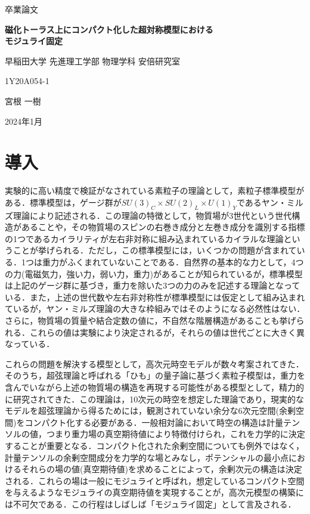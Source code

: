 \documentclass[a4paper,uplatex,dvipdfmx]{jsarticle}
\theoremstyle{definition}
\begin{document}
\begin{titlepage}
\begin{center}
\vspace*{10truemm}
\Large
卒業論文

\bigskip\bigskip
\textbf{\LARGE 
磁化トーラス上にコンパクト化した超対称模型における
\\
モジュライ固定
}

\vspace*{90truemm}
\large
早稲田大学 先進理工学部 物理学科 安倍研究室

\medskip
\large
1Y20A054-1

\bigskip
\Large
宮根 一樹

\bigskip\bigskip\bigskip\bigskip
\large
2024年1月
\end{center}
\end{titlepage}

\setcounter{tocdepth}{3}
\tableofcontents

\clearpage
\section{導入}

実験的に高い精度で検証がなされている素粒子の理論として，素粒子標準模型がある．標準模型は，ゲージ群が$SU(3)_{C}\times SU(2)_{L}\times U(1)_{Y}$であるヤン・ミルズ理論により記述される．この理論の特徴として，物質場が3世代という世代構造があることや，その物質場のスピンの右巻き成分と左巻き成分を識別する指標の1つであるカイラリティが左右非対称に組み込まれているカイラルな理論ということが挙げられる．ただし，この標準模型には，いくつかの問題が含まれている．1つは重力がふくまれていないことである．自然界の基本的な力として，4つの力(電磁気力，強い力，弱い力，重力)があることが知られているが，標準模型は上記のゲージ群に基づき，重力を除いた3つの力のみを記述する理論となっている．また，上述の世代数や左右非対称性が標準模型には仮定として組み込まれているが，ヤン・ミルズ理論の大きな枠組みではそのようになる必然性はない．さらに，物質場の質量や結合定数の値に，不自然な階層構造があることも挙げられる．これらの値は実験により決定されるが，それらの値は世代ごとに大きく異なっている．

これらの問題を解決する模型として，高次元時空モデルが数々考案されてきた．そのうち，超弦理論と呼ばれる「ひも」の量子論に基づく素粒子模型は，重力を含んでいながら上述の物質場の構造を再現する可能性がある模型として，精力的に研究されてきた．この理論は，10次元の時空を想定した理論であり，現実的なモデルを超弦理論から得るためには，観測されていない余分な6次元空間(余剰空間)をコンパクト化する必要がある．一般相対論において時空の構造は計量テンソルの値，つまり重力場の真空期待値により特徴付けられ，これを力学的に決定することが重要となる．コンパクト化された余剰空間についても例外ではなく，計量テンソルの余剰空間成分を力学的な場とみなし，ポテンシャルの最小点におけるそれらの場の値(真空期待値)を求めることによって，余剰次元の構造は決定される．これらの場は一般にモジュライと呼ばれ，想定しているコンパクト空間を与えるようなモジュライの真空期待値を実現することが，高次元模型の構築には不可欠である．この行程はしばしば「モジュライ固定」として言及される．
\end{document}
